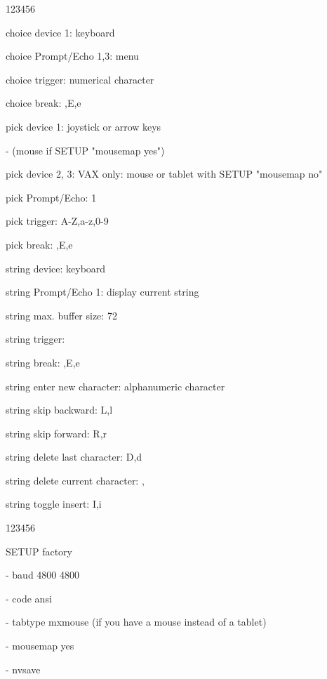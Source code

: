 \begin{DLtt}{123456}
\item[choice device 1:]keyboard
\item[choice Prompt/Echo 1,3:]menu
\item[choice trigger:]numerical character 
\item[choice break:],E,e
\item[pick device 1:]joystick or arrow keys
\item[-](mouse if SETUP "mousemap yes")
\item[pick device 2, 3:]VAX only: mouse or tablet with SETUP "mousemap no"
\item[pick Prompt/Echo: 1]
\item[pick trigger:]A-Z,a-z,0-9
\item[pick break:],E,e
\item[string device:]keyboard
\item[string Prompt/Echo 1:]display current string
\item[string max. buffer size:]72
\item[string trigger:]
\item[string break:],E,e
\item[string enter new character:]alphanumeric character
\item[string skip backward:]L,l
\item[string skip forward:]R,r
\item[string delete last character:]D,d
\item[string delete current character:], 
\item[string toggle insert:]I,i
\end{DLtt}
\begin{DLtt}{123456}
\item[SETUP]factory
\item[-]baud 4800 4800
\item[-]code ansi
\item[-]tabtype mxmouse (if you have a mouse instead of a tablet)
\item[-]mousemap yes
\item[-]nvsave
\end{DLtt}
